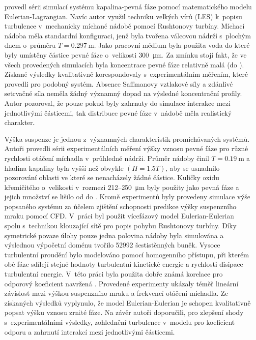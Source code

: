 \citet{derk03} provedl sérii simulací systému kapalina-pevná fáze pomocí matematického modelu Eulerian-Lagrangian. Navíc autor využil techniku velkých vírů (LES) k~popisu turbulence v~mechanicky míchané nádobě pomocí Rushtonovy turbíny. Míchací nádoba měla standardní konfiguraci, jenž byla tvořena válcovou nádrží s~plochým dnem o~průměru $T=\SI{0.297}{\meter}$. Jako pracovní médium byla použita voda do které byly umístěny částice pevné fáze o~velikosti \SI{300}{\micro\meter}. Za zmínku stojí fakt, že ve všech provedených simulacích byla koncentrace pevné fáze relativně malá (do ). Získané výsledky kvalitativně korespondovaly s~experimentálním měřením, které provedli \citet{miche03} pro podobný systém. Absence Saffmanovy vztlakové síly a zdánlivé setrvačné síla neměla žádný významný dopad na výsledné koncentrační profily. Autor pozoroval, že pouze pokud byly zahrnuty do simulace interakce mezi jednotlivými částicemi, tak distribuce pevné fáze v~nádobě měla realistický charakter. 

Výška suspenze je jednou z~významných charakteristik promíchávaných systémů. Autoři \citet{mic04} provedli sérii experimentálních měření výšky vznosu pevné fáze pro různé rychlosti otáčení míchadla v~průhledné nádrži. Průměr nádoby činil $T=\SI{0.19}{\meter}$ a hladina kapaliny byla vyšší než obvykle $(H=\num{1.5}T)$, aby se usnadnilo pozorování oblasti ve které se nenacházely žádné částice. Kuličky oxidu křemičitého o~velikosti v~rozmezí \num{212}--\SI{250}{\micro\meter} byly použity jako pevná fáze a jejich množství se lišilo od  do . Kromě experimentů byly provedeny simulace výše popsaného systému za účelem zjištění schopnosti predikce výšky suspenzního mraku pomocí CFD. V~práci byl použit vícefázový model Eulerian-Eulerian spolu s~technikou klouzající sítě pro popis pohybu Rushtonovy turbíny. Díky symetrické povaze úlohy pouze jedna polovina nádoby byla simulována a výslednou výpočetní doménu tvořilo \num{52992} šestistěnných buněk. Vysoce turbulentní proudění bylo modelováno pomocí homogenního \keps{} přístupu, při kterém obě fáze sdílejí stejné hodnoty turbulentní kinetické energie a rychlosti disipace turbulentní energie. V~této práci byla použita dobře známá korelace pro odporový koeficient navržená \citet{schi32}. Provedené experimenty ukázaly téměř lineární závislost mezi výškou suspenzního mraku a frekvencí otáčení míchadla. Ze získaných výsledků vyplynulo, že model Eulerian-Eulerian je schopen kvalitativně popsat výšku vznosu zrnité fáze. Na závěr autoři doporučili, pro zlepšení shody s~experimentálními výsledky, zohlednění turbulence v~modelu pro koeficient odporu a zahrnutí interakcí mezi jednotlivými částicemi.

